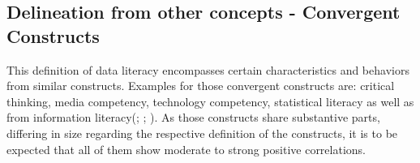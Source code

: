 \documentclass[
  12pt,
  a4paper,
  twoside]{article}
\begin{document}
\subsection{Delineation from other concepts - Convergent Constructs}\label{delineation-from-other-concepts---convergent-constructs}

This definition of data literacy encompasses certain characteristics and behaviors from similar constructs. Examples for those convergent constructs are: critical thinking, media competency, technology competency, statistical literacy as well as from information literacy(; ; ). As those constructs share substantive parts, differing in size regarding the respective definition of the constructs, it is to be expected that all of them show moderate to strong positive correlations.
\end{document}
